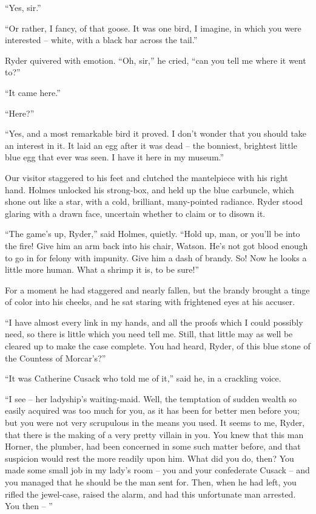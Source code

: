 “Yes, sir.”

“Or rather, I fancy, of that goose. It was one bird, I imagine,
in which you were interested -- white, with a black bar
across the tail.”

Ryder quivered with emotion. “Oh, sir,” he cried, “can you
tell me where it went to?”

“It came here.”

“Here?”

“Yes, and a most remarkable bird it proved. I don’t wonder
that you should take an interest in it. It laid an egg after
it was dead -- the bonniest, brightest little blue egg that ever
was seen. I have it here in my museum.”

Our visitor staggered to his feet and clutched the mantelpiece
with his right hand. Holmes unlocked his strong-box,
and held up the blue carbuncle, which shone out like a star,
with a cold, brilliant, many-pointed radiance. Ryder stood
glaring with a drawn face, uncertain whether to claim or to
disown it.

“The game’s up, Ryder,” said Holmes, quietly. “Hold
up, man, or you’ll be into the fire! Give him an arm back
into his chair, Watson. He’s not got blood enough to go in
for felony with impunity. Give him a dash of brandy. So!
Now he looks a little more human. What a shrimp it is, to
be sure!”

For a moment he had staggered and nearly fallen, but the
brandy brought a tinge of color into his cheeks, and he sat
staring with frightened eyes at his accuser.

“I have almost every link in my hands, and all the proofs
which I could possibly need, so there is little which you need
tell me. Still, that little may as well be cleared up to make
the case complete. You had heard, Ryder, of this blue stone
of the Countess of Morcar’s?”

“It was Catherine Cusack who told me of it,” said he, in a
crackling voice.

“I see -- her ladyship’s waiting-maid. Well, the temptation
of sudden wealth so easily acquired was too much for you, as
it has been for better men before you; but you were not very
scrupulous in the means you used. It seems to me, Ryder,
that there is the making of a very pretty villain in you. You
knew that this man Horner, the plumber, had been concerned
in some such matter before, and that suspicion would rest the
more readily upon him. What did you do, then? You made
some small job in my lady’s room -- you and your confederate
Cusack -- and you managed that he should be the man sent
for. Then, when he had left, you rifled the jewel-case, raised
the alarm, and had this unfortunate man arrested. You
then -- ”

